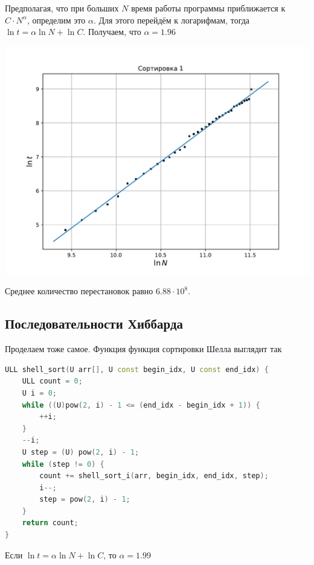 \documentclass[a4paper,12pt]{article}
\begin{document}
Предполагая, что при больших $N$ время работы программы приближается к $C \cdot N^{\alpha}$, определим это $\alpha$. Для этого перейдём к логарифмам, тогда $\ln t = \alpha \ln N +\ln C$. Получаем, что $\alpha = 1.96$

\begin{center}
\includegraphics[scale=0.6]{Figure_2.pdf}
\end{center}

Среднее количество перестановок равно $6.88 \cdot 10^8$.

\subsection*{Последовательности Хиббарда}
Проделаем тоже самое. Функция функция сортировки Шелла выглядит так
\begin{lstlisting}[language=C++]
ULL shell_sort(U arr[], U const begin_idx, U const end_idx) {
    ULL count = 0;
    U i = 0;
    while ((U)pow(2, i) - 1 <= (end_idx - begin_idx + 1)) {
        ++i;
    } 
    --i;
    U step = (U) pow(2, i) - 1;
    while (step != 0) {
        count += shell_sort_i(arr, begin_idx, end_idx, step);
        i--;
        step = pow(2, i) - 1;
    }
    return count;
}
\end{lstlisting}

Если $\ln t = \alpha \ln N + \ln C$, то $\alpha = 1.99$
\end{document}
